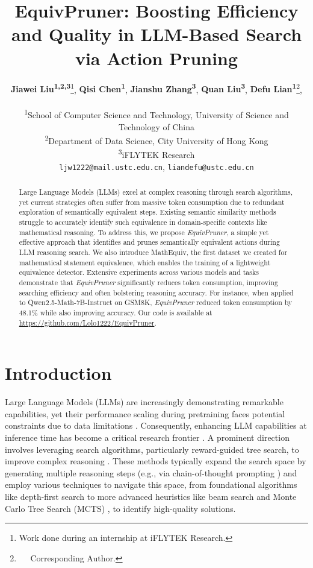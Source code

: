 \documentclass[11pt]{article}
\title{EquivPruner: Boosting Efficiency and Quality in LLM-Based Search via Action Pruning}
\author{
 \textbf{Jiawei Liu\textsuperscript{1,2,3}}\thanks{Work done during an internship at iFLYTEK Research.},
 \textbf{Qisi Chen\textsuperscript{1}},
 \textbf{Jianshu Zhang\textsuperscript{3}},
 \textbf{Quan Liu\textsuperscript{3}},
 \textbf{Defu Lian\textsuperscript{1}}\thanks{$\quad$ Corresponding Author.},
\\
\\
 \textsuperscript{1}School of Computer Science and Technology, University of Science and Technology of China\\
 \textsuperscript{2}Department of Data Science, City University of Hong Kong\\
 \textsuperscript{3}iFLYTEK Research
\\
\texttt{ljw1222@mail.ustc.edu.cn}, 
\texttt{liandefu@ustc.edu.cn} \\
}
\begin{document}
\maketitle
\begin{abstract}
Large Language Models (LLMs) excel at complex reasoning through search algorithms, yet current strategies often suffer from massive token consumption due to redundant exploration of semantically equivalent steps. Existing semantic similarity methods struggle to accurately identify such equivalence in domain-specific contexts like mathematical reasoning. To address this, we propose \textit{EquivPruner}, a simple yet effective approach that identifies and prunes semantically equivalent actions during LLM reasoning search.  We also introduce MathEquiv, the first dataset we created for mathematical statement equivalence, which enables the training of a lightweight equivalence detector. Extensive experiments across various models and tasks demonstrate that \textit{EquivPruner} significantly reduces token consumption, improving searching efficiency and often bolstering reasoning accuracy. For instance, when applied to Qwen2.5-Math-7B-Instruct on GSM8K, \textit{EquivPruner} reduced token consumption by 48.1\% while also improving accuracy. Our code is available at \url{https://github.com/Lolo1222/EquivPruner}.
\end{abstract}

\section{Introduction}
Large Language Models (LLMs) are increasingly demonstrating remarkable capabilities, yet their performance scaling during pretraining faces potential constraints due to data limitations \citep{lightman2023let}. Consequently, enhancing LLM capabilities at inference time has become a critical research frontier \citep{scaling}. A prominent direction involves leveraging search algorithms, particularly reward-guided tree search, to improve complex reasoning \citep{ke2025survey}. These methods typically expand the search space by generating multiple reasoning steps (e.g., via chain-of-thought prompting \citep{wei2022chain}) and 
employ various techniques to navigate this space, from foundational algorithms like depth-first search \citep{yao2023tree} to more advanced heuristics like beam search \citep{kang2024mindstar} and Monte Carlo Tree Search (MCTS) \citep{chenalphamath,zhang2024rest}, to identify high-quality solutions.
\end{document}
